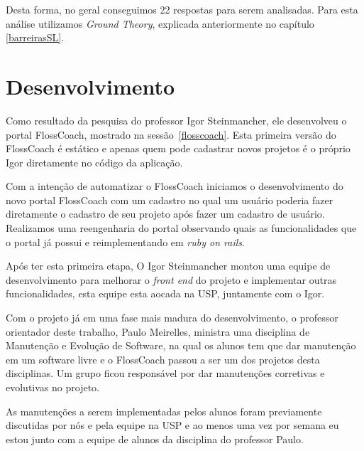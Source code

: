 Desta forma, no geral conseguimos 22 respostas para serem analisadas. Para esta
análise utilizamos \textit{Ground Theory}, explicada anteriormente no capítulo
\ref{barreirasSL}.

\section{Desenvolvimento}

Como resultado da pesquisa do professor Igor Steinmancher, ele desenvolveu o 
portal FlossCoach, mostrado na sessão~\ref{flosscoach}. Esta primeira versão do
FlossCoach é estático e apenas quem pode cadastrar novos projetos é o próprio
Igor diretamente no código da aplicação.

Com a intenção de automatizar o FlossCoach iniciamos o desenvolvimento do novo 
portal FlossCoach com um cadastro no qual um usuário poderia fazer diretamente o
cadastro de seu projeto após fazer um cadastro de usuário. Realizamos uma reengenharia
do portal observando quais as funcionalidades que o portal já possui e reimplementando 
em \textit{ruby on rails}.

Após ter esta primeira etapa, O Igor Steinmancher montou uma equipe de desenvolvimento 
para melhorar o \textit{front end} do projeto e implementar outras funcionalidades, 
esta equipe esta aocada na USP, juntamente com o Igor.

Com o projeto já em uma fase mais madura do desenvolvimento, o professor orientador
deste trabalho, Paulo Meirelles, ministra uma disciplina de Manutenção e Evolução de
Software, na qual os alunos tem que dar manutenção em um software livre e o FlossCoach
passou a ser um dos projetos desta disciplinas. Um grupo ficou responsável por dar 
manutenções corretivas e evolutivas no projeto.

As manutenções a serem implementadas pelos alunos foram previamente discutidas
por nós e pela equipe na USP e ao menos uma vez por semana eu estou junto com a 
equipe de alunos da disciplina do professor Paulo.

